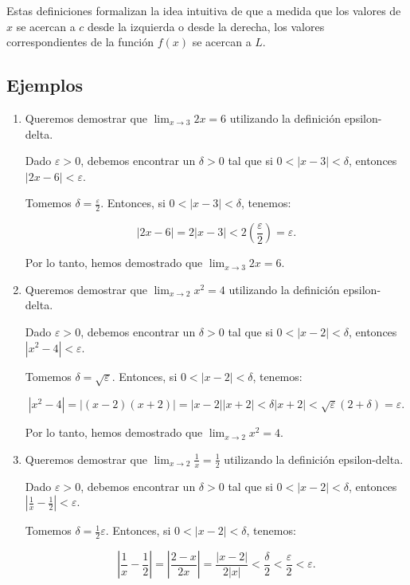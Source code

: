 \documentclass[a4paper,12pt]{article}
\begin{document}
Estas definiciones formalizan la idea intuitiva de que a medida que los valores de $x$ se acercan a $c$ desde la izquierda o desde la derecha, los valores correspondientes de la función $f(x)$ se acercan a $L$.

\subsection*{Ejemplos}

\begin{enumerate}
	\item Queremos demostrar que $\lim_{x\to 3} 2x = 6$ utilizando la definición epsilon-delta.

	Dado $\varepsilon > 0$, debemos encontrar un $\delta > 0$ tal que si $0 < |x - 3| < \delta$, entonces $|2x - 6| < \varepsilon$.

	Tomemos $\delta = \frac{\varepsilon}{2}$. Entonces, si $0 < |x - 3| < \delta$, tenemos:

	\[
	|2x - 6| = 2|x - 3| < 2\left(\frac{\varepsilon}{2}\right) = \varepsilon.
	\]

	Por lo tanto, hemos demostrado que $\lim_{x\to 3} 2x = 6$.

	\item Queremos demostrar que $\lim_{x\to 2} x^2 = 4$ utilizando la definición epsilon-delta.

	Dado $\varepsilon > 0$, debemos encontrar un $\delta > 0$ tal que si $0 < |x - 2| < \delta$, entonces $|x^2 - 4| < \varepsilon$.

	Tomemos $\delta = \sqrt{\varepsilon}$. Entonces, si $0 < |x - 2| < \delta$, tenemos:

	\[
	|x^2 - 4| = |(x - 2)(x + 2)| = |x - 2||x + 2| < \delta|x + 2| < \sqrt{\varepsilon}(2 + \delta) = \varepsilon.
	\]

	Por lo tanto, hemos demostrado que $\lim_{x\to 2} x^2 = 4$.

	\item Queremos demostrar que $\lim_{x\to 2} \frac{1}{x} = \frac{1}{2}$ utilizando la definición epsilon-delta.

	Dado $\varepsilon > 0$, debemos encontrar un $\delta > 0$ tal que si $0 < |x - 2| < \delta$, entonces $\left|\frac{1}{x} - \frac{1}{2}\right| < \varepsilon$.

	Tomemos $\delta = \frac{1}{2}\varepsilon$. Entonces, si $0 < |x - 2| < \delta$, tenemos:

	\[
	\left|\frac{1}{x} - \frac{1}{2}\right| = \left|\frac{2 - x}{2x}\right| = \frac{|x - 2|}{2|x|} < \frac{\delta}{2} < \frac{\varepsilon}{2} < \varepsilon.
	\]


\end{enumerate}
\end{document}
